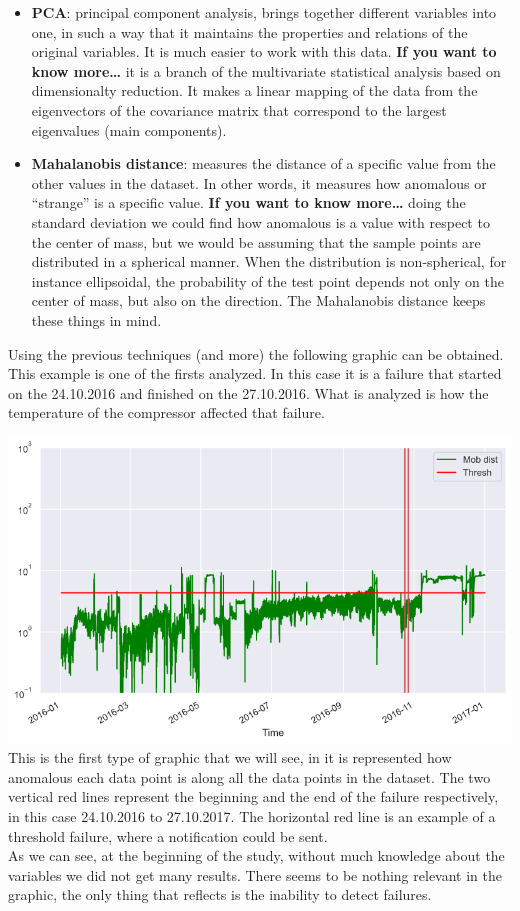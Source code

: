 \documentclass[
]{article}
\begin{document}
\begin{itemize}
\item
  \textbf{PCA}: principal component analysis, brings together different
  variables into one, in such a way that it maintains the properties and
  relations of the original variables. It is much easier to work with
  this data. \textbf{If you want to know more\ldots{}} it is a branch of
  the multivariate statistical analysis based on dimensionalty
  reduction. It makes a linear mapping of the data from the eigenvectors
  of the covariance matrix that correspond to the largest eigenvalues
  (main components).
\item
  \textbf{Mahalanobis distance}: measures the distance of a specific
  value from the other values in the dataset. In other words, it
  measures how anomalous or ``strange'' is a specific value. \textbf{If
  you want to know more\ldots{}} doing the standard deviation we could
  find how anomalous is a value with respect to the center of mass, but
  we would be assuming that the sample points are distributed in a
  spherical manner. When the distribution is non-spherical, for instance
  ellipsoidal, the probability of the test point depends not only on the
  center of mass, but also on the direction. The Mahalanobis distance
  keeps these things in mind.
\end{itemize}

Using the previous techniques (and more) the following graphic can be
obtained.\\
This example is one of the firsts analyzed. In this case it is a failure
that started on the 24.10.2016 and finished on the 27.10.2016. What is
analyzed is how the temperature of the compressor affected that failure.

\includegraphics{relevant_graphs/4_4_AM.png} This is the first type of
graphic that we will see, in it is represented how anomalous each data
point is along all the data points in the dataset. The two vertical red
lines represent the beginning and the end of the failure respectively,
in this case 24.10.2016 to 27.10.2017. The horizontal red line is an
example of a threshold failure, where a notification could be sent.\\
As we can see, at the beginning of the study, without much knowledge
about the variables we did not get many results. There seems to be
nothing relevant in the graphic, the only thing that reflects is the
inability to detect failures.
\end{document}
